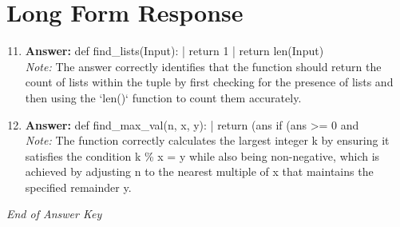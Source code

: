 \documentclass[12pt]{article}
\begin{document}
\section*{Long Form Response}
\begin{enumerate}[label=\arabic*.]
\setcounter{enumi}{10}
\item \textbf{Answer:} def find\_lists(Input): | return 1 | return len(Input)
\\ \textit{Note:} The answer correctly identifies that the function should return the count of lists within the tuple by first checking for the presence of lists and then using the `len()` function to count them accurately.
\item \textbf{Answer:} def find\_max\_val(n, x, y): | return (ans if (ans \textgreater{}= 0 and
\\ \textit{Note:} The function correctly calculates the largest integer k by ensuring it satisfies the condition k \% x = y while also being non-negative, which is achieved by adjusting n to the nearest multiple of x that maintains the specified remainder y.
\end{enumerate}

\vfill
\noindent\textit{End of Answer Key}
\end{document}
